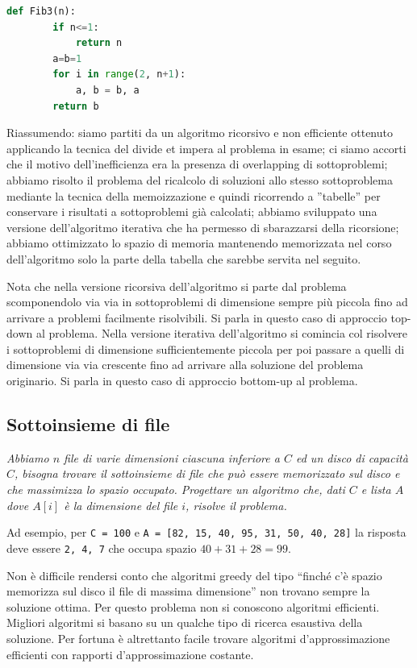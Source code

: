 \begin{lstlisting}[language=Python]
    def Fib3(n):
        if n<=1:
            return n
        a=b=1
        for i in range(2, n+1):
            a, b = b, a
        return b
\end{lstlisting}
Riassumendo: siamo partiti da un algoritmo ricorsivo e non efficiente ottenuto applicando la tecnica del divide et impera al problema in esame; ci siamo accorti che il motivo dell'inefficienza era la presenza di overlapping di sottoproblemi; abbiamo risolto il problema del ricalcolo di soluzioni allo stesso sottoproblema mediante la tecnica della memoizzazione e quindi ricorrendo a ”tabelle” per conservare i risultati a sottoproblemi già calcolati; abbiamo sviluppato una versione dell'algoritmo iterativa che ha permesso di sbarazzarsi della ricorsione; abbiamo ottimizzato lo spazio di memoria mantenendo memorizzata nel corso dell'algoritmo solo la parte della tabella che sarebbe servita nel seguito.

Nota che nella versione ricorsiva dell'algoritmo si parte dal problema scomponendolo via via
in sottoproblemi di dimensione sempre più piccola fino ad arrivare a problemi facilmente risolvibili. Si parla in questo caso di approccio top-down al problema. Nella versione iterativa dell'algoritmo si comincia col risolvere i sottoproblemi di dimensione sufficientemente piccola per poi passare a quelli di dimensione via via crescente fino ad arrivare alla soluzione del
problema originario. Si parla in questo caso di approccio bottom-up al problema.

\subsection{Sottoinsieme di file}
\textit{Abbiamo $n$ file di varie dimensioni ciascuna inferiore a $C$ ed un disco di capacità $C$, bisogna trovare il sottoinsieme di file che può essere memorizzato sul disco e che massimizza lo spazio occupato. Progettare un algoritmo che, dati $C$ e lista $A$ dove $A[i]$ è la dimensione del file $i$, risolve il problema.}

Ad esempio, per \verb|C = 100| e \texttt{A = [82, 15, 40, 95, 31, 50, 40, 28]} la risposta deve essere \texttt{{2, 4, 7}} che occupa spazio $40 + 31 + 28 = 99$.

Non è difficile rendersi conto che algoritmi greedy del tipo “finché c'è spazio memorizza sul disco il file di massima dimensione” non trovano sempre la soluzione ottima. Per questo problema non si conoscono algoritmi efficienti. Migliori algoritmi si basano su un qualche tipo di ricerca esaustiva della soluzione. Per fortuna è altrettanto facile trovare algoritmi d'approssimazione efficienti con rapporti d'approssimazione costante.

